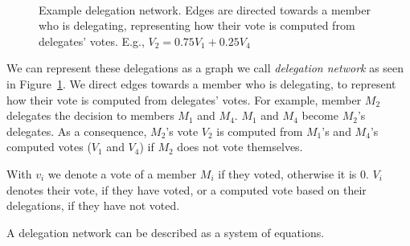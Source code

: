 \documentclass{sigchi}
\begin{document}
\begin{figure}
  \centering
  \caption{Example delegation network. Edges are directed towards a member who is delegating, representing how their
  vote is computed from delegates' votes. E.g., $V_2 = 0.75 V_1 + 0.25 V_4$}~\label{fig:delegation-network}
\end{figure}

We can represent these delegations as a graph we call \emph{delegation network} as seen in
Figure~\ref{fig:delegation-network}.
We direct edges towards a member who is delegating, to represent how their vote is computed from delegates' votes.
For example, member $M_2$ delegates the decision to members $M_1$ and $M_4$.
$M_1$ and $M_4$ become $M_2$'s delegates.
As a consequence, $M_2$'s vote $V_2$ is computed from $M_1$'s and $M_4$'s computed votes ($V_1$ and $V_4$)
if $M_2$ does not vote themselves.

With $v_i$ we denote a vote of a member $M_i$ if they voted, otherwise it is $0$.
$V_i$ denotes their vote, if they have voted, or a computed vote based on their delegations, if they have not voted.

A delegation network can be described as a system of equations.

\end{document}
